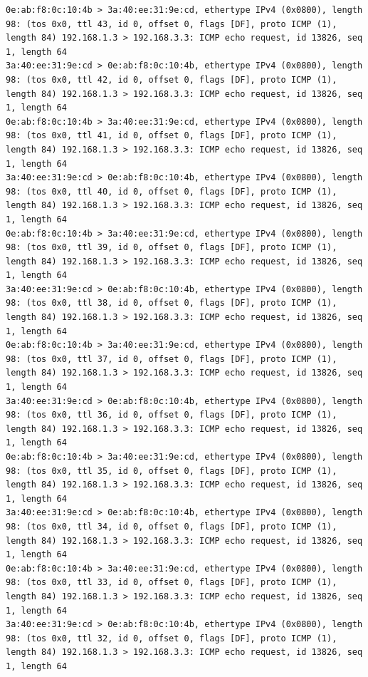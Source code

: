 \documentclass[a4paper,12pt]{article}
\begin{document}
\begin{Verbatim}
0e:ab:f8:0c:10:4b > 3a:40:ee:31:9e:cd, ethertype IPv4 (0x0800), length 98: (tos 0x0, ttl 43, id 0, offset 0, flags [DF], proto ICMP (1), length 84) 192.168.1.3 > 192.168.3.3: ICMP echo request, id 13826, seq 1, length 64
3a:40:ee:31:9e:cd > 0e:ab:f8:0c:10:4b, ethertype IPv4 (0x0800), length 98: (tos 0x0, ttl 42, id 0, offset 0, flags [DF], proto ICMP (1), length 84) 192.168.1.3 > 192.168.3.3: ICMP echo request, id 13826, seq 1, length 64
0e:ab:f8:0c:10:4b > 3a:40:ee:31:9e:cd, ethertype IPv4 (0x0800), length 98: (tos 0x0, ttl 41, id 0, offset 0, flags [DF], proto ICMP (1), length 84) 192.168.1.3 > 192.168.3.3: ICMP echo request, id 13826, seq 1, length 64
3a:40:ee:31:9e:cd > 0e:ab:f8:0c:10:4b, ethertype IPv4 (0x0800), length 98: (tos 0x0, ttl 40, id 0, offset 0, flags [DF], proto ICMP (1), length 84) 192.168.1.3 > 192.168.3.3: ICMP echo request, id 13826, seq 1, length 64
0e:ab:f8:0c:10:4b > 3a:40:ee:31:9e:cd, ethertype IPv4 (0x0800), length 98: (tos 0x0, ttl 39, id 0, offset 0, flags [DF], proto ICMP (1), length 84) 192.168.1.3 > 192.168.3.3: ICMP echo request, id 13826, seq 1, length 64
3a:40:ee:31:9e:cd > 0e:ab:f8:0c:10:4b, ethertype IPv4 (0x0800), length 98: (tos 0x0, ttl 38, id 0, offset 0, flags [DF], proto ICMP (1), length 84) 192.168.1.3 > 192.168.3.3: ICMP echo request, id 13826, seq 1, length 64
0e:ab:f8:0c:10:4b > 3a:40:ee:31:9e:cd, ethertype IPv4 (0x0800), length 98: (tos 0x0, ttl 37, id 0, offset 0, flags [DF], proto ICMP (1), length 84) 192.168.1.3 > 192.168.3.3: ICMP echo request, id 13826, seq 1, length 64
3a:40:ee:31:9e:cd > 0e:ab:f8:0c:10:4b, ethertype IPv4 (0x0800), length 98: (tos 0x0, ttl 36, id 0, offset 0, flags [DF], proto ICMP (1), length 84) 192.168.1.3 > 192.168.3.3: ICMP echo request, id 13826, seq 1, length 64
0e:ab:f8:0c:10:4b > 3a:40:ee:31:9e:cd, ethertype IPv4 (0x0800), length 98: (tos 0x0, ttl 35, id 0, offset 0, flags [DF], proto ICMP (1), length 84) 192.168.1.3 > 192.168.3.3: ICMP echo request, id 13826, seq 1, length 64
3a:40:ee:31:9e:cd > 0e:ab:f8:0c:10:4b, ethertype IPv4 (0x0800), length 98: (tos 0x0, ttl 34, id 0, offset 0, flags [DF], proto ICMP (1), length 84) 192.168.1.3 > 192.168.3.3: ICMP echo request, id 13826, seq 1, length 64
0e:ab:f8:0c:10:4b > 3a:40:ee:31:9e:cd, ethertype IPv4 (0x0800), length 98: (tos 0x0, ttl 33, id 0, offset 0, flags [DF], proto ICMP (1), length 84) 192.168.1.3 > 192.168.3.3: ICMP echo request, id 13826, seq 1, length 64
3a:40:ee:31:9e:cd > 0e:ab:f8:0c:10:4b, ethertype IPv4 (0x0800), length 98: (tos 0x0, ttl 32, id 0, offset 0, flags [DF], proto ICMP (1), length 84) 192.168.1.3 > 192.168.3.3: ICMP echo request, id 13826, seq 1, length 64

\end{Verbatim}
\end{document}

